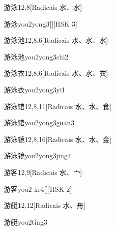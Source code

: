 \begin{entry}{游泳}{12,8}[Radicais ⽔、⽔]
  \begin{phonetics}{游泳}{you2yong3}[][HSK 3]
  \end{phonetics}
\end{entry}

\begin{entry}{游泳池}{12,8,6}[Radicais ⽔、⽔、⽔]
  \begin{phonetics}{游泳池}{you2yong3chi2}
  \end{phonetics}
\end{entry}

\begin{entry}{游泳衣}{12,8,6}[Radicais ⽔、⽔、⾐]
  \begin{phonetics}{游泳衣}{you2yong3yi1}
  \end{phonetics}
\end{entry}

\begin{entry}{游泳馆}{12,8,11}[Radicais ⽔、⽔、⾷]
  \begin{phonetics}{游泳馆}{you2yong3guan3}
  \end{phonetics}
\end{entry}

\begin{entry}{游泳镜}{12,8,16}[Radicais ⽔、⽔、⾦]
  \begin{phonetics}{游泳镜}{you2yong3jing4}
  \end{phonetics}
\end{entry}

\begin{entry}{游客}{12,9}[Radicais ⽔、⼧]
  \begin{phonetics}{游客}{you2 ke4}[][HSK 2]
  \end{phonetics}
\end{entry}

\begin{entry}{游艇}{12,12}[Radicais ⽔、⾈]
  \begin{phonetics}{游艇}{you2ting3}
  \end{phonetics}
\end{entry}


